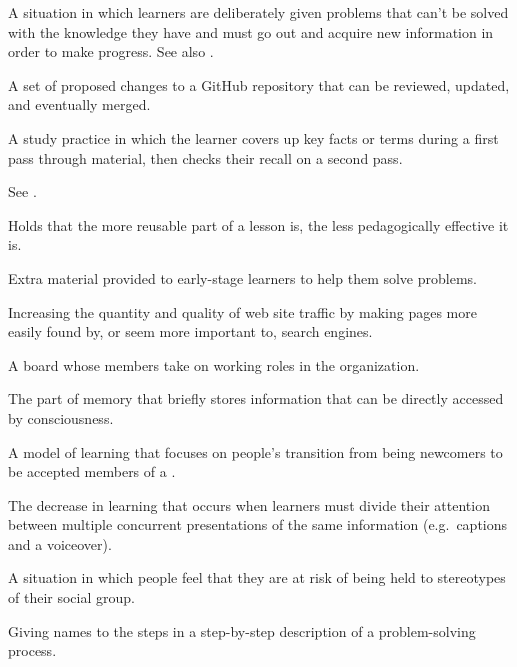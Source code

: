 \begin{description}
 A situation in which learners
are deliberately given problems that can't be solved with the knowledge they
have and must go out and acquire new information in order to make progress.
See also .

 A set of proposed changes to a GitHub
repository that can be reviewed, updated, and eventually merged.

 A study practice in which
the learner covers up key facts or terms during a first pass through material,
then checks their recall on a second pass.

See .

 Holds that the more reusable
part of a lesson is, the less pedagogically effective it is.

 Extra material provided to early-stage
learners to help them solve problems.

 Increasing the quantity and quality
of web site traffic by making pages more easily found by, or seem more important
to, search engines.

 A board whose members take on working roles
in the organization.

 The part of memory that briefly
stores information that can be directly accessed by consciousness.

 A model of learning that focuses
on people's transition from being newcomers to be accepted members of a
.

 The decrease in
learning that occurs when learners must divide their attention between multiple
concurrent presentations of the same information (e.g.\ captions and a
voiceover).

 A situation in which people feel
that they are at risk of being held to stereotypes of their social group.

 Giving names to the steps in a
step-by-step description of a problem-solving process.


\end{description}
